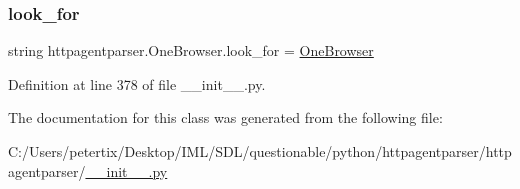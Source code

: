 \subsubsection{\texorpdfstring{look\+\_\+for}{look\_for}}
{\footnotesize\ttfamily string httpagentparser.\+One\+Browser.\+look\+\_\+for = \textquotesingle{}\hyperlink{classhttpagentparser_1_1_one_browser}{One\+Browser}\textquotesingle{}\hspace{0.3cm}{\ttfamily [static]}}



Definition at line 378 of file \+\_\+\+\_\+init\+\_\+\+\_\+.\+py.



The documentation for this class was generated from the following file\+:\begin{DoxyCompactItemize}
\item 
C\+:/\+Users/petertix/\+Desktop/\+I\+M\+L/\+S\+D\+L/questionable/python/httpagentparser/httpagentparser/\hyperlink{____init_____8py}{\+\_\+\+\_\+init\+\_\+\+\_\+.\+py}\end{DoxyCompactItemize}
